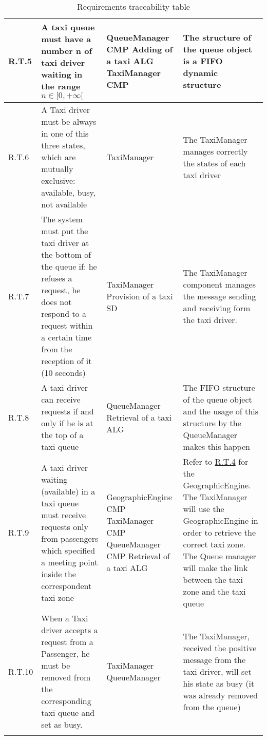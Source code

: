 \begin{center}
\begin{longtable}{|p{}| p{}|p{}|p{}|}
R.T.5 & A taxi queue must have a number n of taxi driver waiting in the range $n \in [0, +\infty[$ & QueueManager CMP \linebreak
Adding of a taxi ALG \linebreak TaxiManager CMP & The structure of the queue object is a FIFO dynamic structure \\ \hline
R.T.6 & A Taxi driver must be always in one of this three states, which are mutually exclusive: available, busy, not available & TaxiManager & The TaxiManager manages correctly the states of each taxi driver \\ \hline
R.T.7 & The system must put the taxi driver at the bottom of the queue if: he refuses a request, he does not respond to a request within a certain time from the reception of it (10 seconds) & TaxiManager \linebreak Provision of a taxi SD & The TaxiManager component manages the message sending and receiving form the taxi driver. \\ \hline
R.T.8 & A taxi driver can receive requests if and only if he is at the top of a taxi queue & QueueManager \linebreak Retrieval of a taxi ALG & The FIFO structure of the queue object and the usage of this structure by the QueueManager makes this happen \\ \hline
R.T.9 & A taxi driver waiting (available) in a taxi queue must receive requests only from passengers which specified a meeting point inside the correspondent taxi zone & GeographicEngine CMP \linebreak TaxiManager CMP \linebreak QueueManager CMP \linebreak Retrieval of a taxi ALG & Refer to \hyperref[R.T.4]{R.T.4} for the GeographicEngine. \linebreak The TaxiManager will use the GeographicEngine in order to retrieve the correct taxi zone. \linebreak The Queue manager will make the link between the taxi zone and the taxi queue  \\ \hline
R.T.10 & When a Taxi driver accepts a request from a Passenger, he must be removed from the corresponding taxi queue and set as busy. & TaxiManager \linebreak QueueManager & The TaxiManager, received the positive message from the taxi driver, will set his state as busy (it was already removed from the queue) \\ \hline
\caption{Requirements traceability table} 
\label{tab:reqTraceTable}
\end{longtable} 
\end{center}